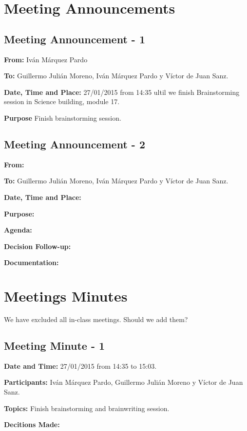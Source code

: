 \section{Meeting Announcements}
\subsection{Meeting Announcement - 1}

\textbf{From: } Iván Márquez Pardo

\textbf{To: } Guillermo Julián Moreno, Iván Márquez Pardo y Víctor de Juan Sanz.

\textbf{Date, Time and Place: } 27/01/2015 from 14:35 ultil we finish Brainstorming session in Science building, module 17.

\textbf{Purpose} Finish brainstorming session.

\subsection{Meeting Announcement - 2}


\textbf{From: }

\textbf{To: } Guillermo Julián Moreno, Iván Márquez Pardo y Víctor de Juan Sanz.


\textbf{Date, Time and Place: }


\textbf{Purpose: }


\textbf{Agenda: }

\textbf{Decision Follow-up: }


\textbf{Documentation: }


\section{Meetings Minutes}

We have excluded all in-class meetings. Should we add them?

\subsection{Meeting Minute - 1}


\textbf{Date and Time:} 27/01/2015 from 14:35 to 15:03.


\textbf{Participants: } Iván Márquez Pardo, Guillermo Julián Moreno y Víctor de Juan Sanz.


\textbf{Topics: }
Finish brainstorming and brainwriting session.


\textbf{Decitions Made: \\}

